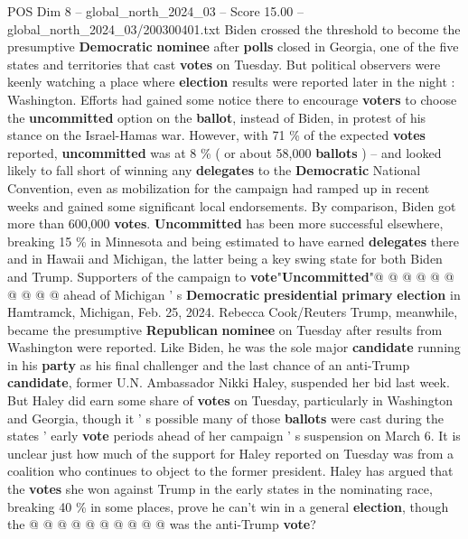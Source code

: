 \begin{textsample}{POS Dim 8 – global\_north\_2024\_03 – Score 15.00 – global\_north\_2024\_03/200300401.txt}  \label{ex:f8_pos_002}
Biden crossed the threshold to become the presumptive \textbf{Democratic} \textbf{nominee} after \textbf{polls} closed in Georgia, one of the five states and territories that cast \textbf{votes} on Tuesday.
But political observers were keenly watching a place where \textbf{election} results were reported later in the night : Washington.
Efforts had gained some notice there to encourage \textbf{voters} to choose the \textbf{uncommitted} option on the \textbf{ballot}, instead of Biden, in protest of his stance on the Israel-Hamas war.
However, with 71 \% of the expected \textbf{votes} reported, \textbf{uncommitted} was at 8 \% ( or about 58,000 \textbf{ballots} ) -- and looked likely to fall short of winning any \textbf{delegates} to the \textbf{Democratic} National Convention, even as mobilization for the campaign had ramped up in recent weeks and gained some significant local endorsements.
By comparison, Biden got more than 600,000 \textbf{votes}. \textbf{Uncommitted} has been more successful elsewhere, breaking 15 \% in Minnesota and being estimated to have earned \textbf{delegates} there and in Hawaii and Michigan, the latter being a key swing state for both Biden and Trump.
Supporters of the campaign to \textbf{vote}"\textbf{Uncommitted}"@ @ @ @ @ @ @ @ @ @ ahead of Michigan ' s \textbf{Democratic} \textbf{presidential} \textbf{primary} \textbf{election} in Hamtramck, Michigan, Feb. 25, 2024.
Rebecca Cook/Reuters Trump, meanwhile, became the presumptive \textbf{Republican} \textbf{nominee} on Tuesday after results from Washington were reported.
Like Biden, he was the sole major \textbf{candidate} running in his \textbf{party} as his final challenger and the last chance of an anti-Trump \textbf{candidate}, former U.N.
Ambassador Nikki Haley, suspended her bid last week.
But Haley did earn some share of \textbf{votes} on Tuesday, particularly in Washington and Georgia, though it ' s possible many of those \textbf{ballots} were cast during the states ' early \textbf{vote} periods ahead of her campaign ' s suspension on March 6.
It is unclear just how much of the support for Haley reported on Tuesday was from a coalition who continues to object to the former president.
Haley has argued that the \textbf{votes} she won against Trump in the early states in the nominating race, breaking 40 \% in some places, prove he can't win in a general \textbf{election}, though the @ @ @ @ @ @ @ @ @ @ was the anti-Trump \textbf{vote}?

\end{textsample}
